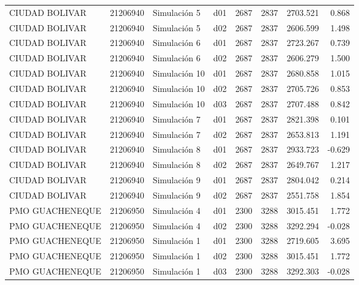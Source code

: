 \begin{landscape}
\begin{longtable}{lrlp{2cm}p{2cm}p{3cm}p{2cm}r}
          CIUDAD BOLIVAR &  21206940 &   Simulación 5 &   d01 &      2687 &     2837 &  2703.521 &     0.868 \\
          CIUDAD BOLIVAR &  21206940 &   Simulación 5 &   d02 &      2687 &     2837 &  2606.599 &     1.498 \\
          CIUDAD BOLIVAR &  21206940 &   Simulación 6 &   d01 &      2687 &     2837 &  2723.267 &     0.739 \\
          CIUDAD BOLIVAR &  21206940 &   Simulación 6 &   d02 &      2687 &     2837 &  2606.279 &     1.500 \\
          CIUDAD BOLIVAR &  21206940 &  Simulación 10 &   d01 &      2687 &     2837 &  2680.858 &     1.015 \\
          CIUDAD BOLIVAR &  21206940 &  Simulación 10 &   d02 &      2687 &     2837 &  2705.726 &     0.853 \\
          CIUDAD BOLIVAR &  21206940 &  Simulación 10 &   d03 &      2687 &     2837 &  2707.488 &     0.842 \\
          CIUDAD BOLIVAR &  21206940 &   Simulación 7 &   d01 &      2687 &     2837 &  2821.398 &     0.101 \\
          CIUDAD BOLIVAR &  21206940 &   Simulación 7 &   d02 &      2687 &     2837 &  2653.813 &     1.191 \\
          CIUDAD BOLIVAR &  21206940 &   Simulación 8 &   d01 &      2687 &     2837 &  2933.723 &    -0.629 \\
          CIUDAD BOLIVAR &  21206940 &   Simulación 8 &   d02 &      2687 &     2837 &  2649.767 &     1.217 \\
          CIUDAD BOLIVAR &  21206940 &   Simulación 9 &   d01 &      2687 &     2837 &  2804.042 &     0.214 \\
          CIUDAD BOLIVAR &  21206940 &   Simulación 9 &   d02 &      2687 &     2837 &  2551.758 &     1.854 \\
         PMO GUACHENEQUE &  21206950 &   Simulación 4 &   d01 &      2300 &     3288 &  3015.451 &     1.772 \\
         PMO GUACHENEQUE &  21206950 &   Simulación 4 &   d02 &      2300 &     3288 &  3292.294 &    -0.028 \\
         PMO GUACHENEQUE &  21206950 &   Simulación 1 &   d01 &      2300 &     3288 &  2719.605 &     3.695 \\
         PMO GUACHENEQUE &  21206950 &   Simulación 1 &   d02 &      2300 &     3288 &  3015.451 &     1.772 \\
         PMO GUACHENEQUE &  21206950 &   Simulación 1 &   d03 &      2300 &     3288 &  3292.303 &    -0.028 \\

\end{longtable}
\end{landscape}
